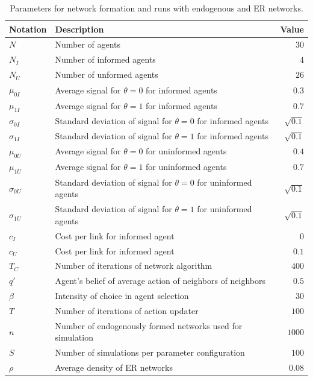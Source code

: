 \documentclass[10pt,a4paper]{article}
\begin{document}
\begin{table}[h]
\begin{tabular}{llr} 
\toprule
Notation & Description & Value \\
\midrule
$N$ & Number of agents & $30$\\
$N_I$ & Number of informed agents & $4$\\
$N_U$ & Number of unformed agents & $26$\\
$\mu_{0I}$ & Average signal for $\theta = 0$ for informed agents& $0.3$\\
$\mu_{1I}$ & Average signal for $\theta = 1$ for informed agents& $0.7$\\
$\sigma_{0I}$ & Standard deviation of signal for $\theta = 0$ for informed agents& $\sqrt{0.1}$ \\
$\sigma_{1I}$ & Standard deviation of signal for $\theta = 1$ for informed agents& $\sqrt{0.1}$ \\
$\mu_{0U}$ & Average signal for $\theta = 0$ for uninformed agents& $0.4$\\
$\mu_{1U}$ & Average signal for $\theta = 1$ for uninformed agents& $0.7$\\
$\sigma_{0U}$ & Standard deviation of signal for $\theta = 0$ for uninformed agents& $\sqrt{0.1}$ \\
$\sigma_{1U}$ & Standard deviation of signal for $\theta = 1$ for uninformed agents& $\sqrt{0.1}$ \\
$c_{I}$ & Cost per link for informed agent& $0$\\
$c_{U}$ & Cost per link for informed agent& $0.1$\\
$T_C$ & Number of iterations of network algorithm & $400$ \\
$q'$ & Agent's belief of average action of neighbors of neighbors & $0.5$ \\
$\beta$ & Intensity of choice in agent selection & $30$ \\
\midrule
$T$ & Number of iterations of action updater & $100$ \\ 
$n$ & Number of endogenously formed networks used for simulation & $1000$ \\ 
$S$ & Number of simulations per parameter configuration & $100$ \\
$\rho$ & Average density of ER networks & $0.08$ \\ 
\bottomrule 
\end{tabular}
\caption{Parameters for network formation and runs with endogenous and ER networks.}
\end{table}
\end{document}
